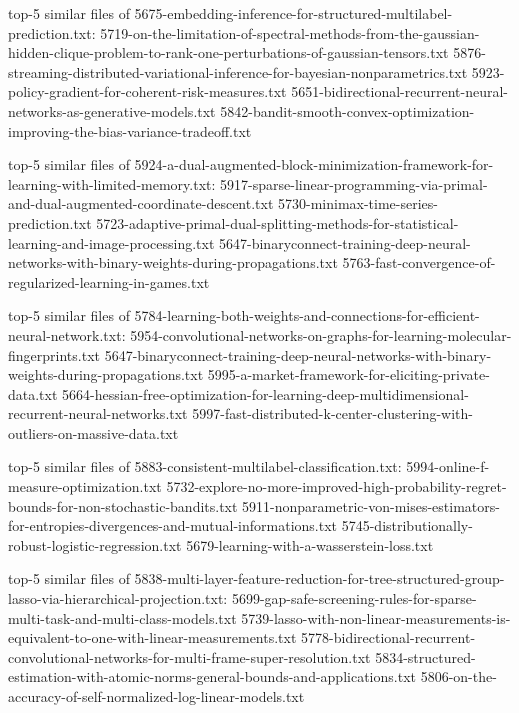 \documentclass[11pt]{article}
\begin{document}
top-5 similar files of
5675-embedding-inference-for-structured-multilabel-prediction.txt:
5719-on-the-limitation-of-spectral-methods-from-the-gaussian-hidden-clique-problem-to-rank-one-perturbations-of-gaussian-tensors.txt
5876-streaming-distributed-variational-inference-for-bayesian-nonparametrics.txt
5923-policy-gradient-for-coherent-risk-measures.txt
5651-bidirectional-recurrent-neural-networks-as-generative-models.txt
5842-bandit-smooth-convex-optimization-improving-the-bias-variance-tradeoff.txt

top-5 similar files of
5924-a-dual-augmented-block-minimization-framework-for-learning-with-limited-memory.txt:
5917-sparse-linear-programming-via-primal-and-dual-augmented-coordinate-descent.txt
5730-minimax-time-series-prediction.txt
5723-adaptive-primal-dual-splitting-methods-for-statistical-learning-and-image-processing.txt
5647-binaryconnect-training-deep-neural-networks-with-binary-weights-during-propagations.txt
5763-fast-convergence-of-regularized-learning-in-games.txt

top-5 similar files of
5784-learning-both-weights-and-connections-for-efficient-neural-network.txt:
5954-convolutional-networks-on-graphs-for-learning-molecular-fingerprints.txt
5647-binaryconnect-training-deep-neural-networks-with-binary-weights-during-propagations.txt
5995-a-market-framework-for-eliciting-private-data.txt
5664-hessian-free-optimization-for-learning-deep-multidimensional-recurrent-neural-networks.txt
5997-fast-distributed-k-center-clustering-with-outliers-on-massive-data.txt

top-5 similar files of 5883-consistent-multilabel-classification.txt:
5994-online-f-measure-optimization.txt
5732-explore-no-more-improved-high-probability-regret-bounds-for-non-stochastic-bandits.txt
5911-nonparametric-von-mises-estimators-for-entropies-divergences-and-mutual-informations.txt
5745-distributionally-robust-logistic-regression.txt
5679-learning-with-a-wasserstein-loss.txt

top-5 similar files of
5838-multi-layer-feature-reduction-for-tree-structured-group-lasso-via-hierarchical-projection.txt:
5699-gap-safe-screening-rules-for-sparse-multi-task-and-multi-class-models.txt
5739-lasso-with-non-linear-measurements-is-equivalent-to-one-with-linear-measurements.txt
5778-bidirectional-recurrent-convolutional-networks-for-multi-frame-super-resolution.txt
5834-structured-estimation-with-atomic-norms-general-bounds-and-applications.txt
5806-on-the-accuracy-of-self-normalized-log-linear-models.txt
\end{document}
